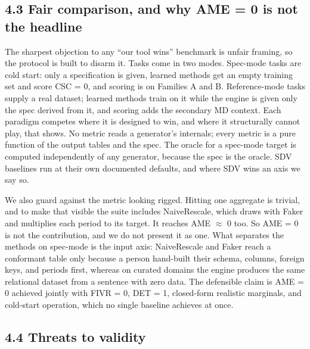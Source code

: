 \hypertarget{fair-comparison-and-why-ame-0-is-not-the-headline}{%
\subsection{4.3 Fair comparison, and why AME = 0 is not the
headline}\label{fair-comparison-and-why-ame-0-is-not-the-headline}}

The sharpest objection to any ``our tool wins'' benchmark is unfair
framing, so the protocol is built to disarm it. Tasks come in two modes.
Spec-mode tasks are cold start: only a specification is given, learned
methods get an empty training set and score CSC = 0, and scoring is on
Families A and B. Reference-mode tasks supply a real dataset; learned
methods train on it while the engine is given only the spec derived from
it, and scoring adds the secondary MD context. Each paradigm competes
where it is designed to win, and where it structurally cannot play, that
shows. No metric reads a generator's internals; every metric is a pure
function of the output tables and the spec. The oracle for a spec-mode
target is computed independently of any generator, because the spec is
the oracle. SDV baselines run at their own documented defaults, and
where SDV wins an axis we say so.

We also guard against the metric looking rigged. Hitting one aggregate
is trivial, and to make that visible the suite includes NaiveRescale,
which draws with Faker and multiplies each period to its target. It
reaches AME \ensuremath{\approx} 0 too. So AME = 0 is not the
contribution, and we do not present it as one. What separates the
methods on spec-mode is the input axis: NaiveRescale and Faker reach a
conformant table only because a person hand-built their schema, columns,
foreign keys, and periods first, whereas on curated domains the engine
produces the same relational dataset from a sentence with zero data. The
defensible claim is AME = 0 achieved jointly with FIVR = 0, DET = 1,
closed-form realistic marginals, and cold-start operation, which no
single baseline achieves at once.

\hypertarget{threats-to-validity}{%
\subsection{4.4 Threats to validity}\label{threats-to-validity}}

